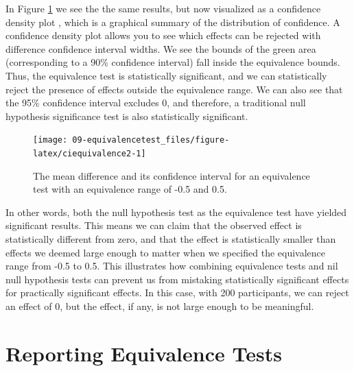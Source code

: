 \documentclass[
  oneside]{book}
\begin{document}
In Figure \ref{fig:ciequivalence2} we see the the same results, but now visualized as a confidence density plot \citep{schweder_confidence_2016}, which is a graphical summary of the distribution of confidence. A confidence density plot allows you to see which effects can be rejected with difference confidence interval widths. We see the bounds of the green area (corresponding to a 90\% confidence interval) fall inside the equivalence bounds. Thus, the equivalence test is statistically significant, and we can statistically reject the presence of effects outside the equivalence range. We can also see that the 95\% confidence interval excludes 0, and therefore, a traditional null hypothesis significance test is also statistically significant.



\begin{figure}

{\centering \texttt{[image: 09-equivalencetest\_files/figure-latex/ciequivalence2-1]} 

}

\caption{The mean difference and its confidence interval for an equivalence test with an equivalence range of -0.5 and 0.5.}\label{fig:ciequivalence2}
\end{figure}

In other words, both the null hypothesis test as the equivalence test have yielded significant results. This means we can claim that the observed effect is statistically different from zero, and that the effect is statistically smaller than effects we deemed large enough to matter when we specified the equivalence range from -0.5 to 0.5. This illustrates how combining equivalence tests and nil null hypothesis tests can prevent us from mistaking statistically significant effects for practically significant effects. In this case, with 200 participants, we can reject an effect of 0, but the effect, if any, is not large enough to be meaningful.

\hypertarget{reporting-equivalence-tests}{%
\section{Reporting Equivalence Tests}\label{reporting-equivalence-tests}}
\end{document}
